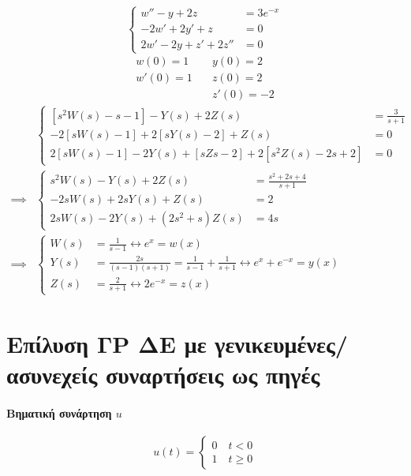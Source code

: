 \documentclass[11pt,a4paper,titlepage,final]{article}
\begin{document}
\begin{exercise*}{12.17}
	\[
	\begin{cases}
	w''-y+2z &= 3e^{-x} \\
	-2w'+2y'+z &= 0 \\
	2w'-2y+z'+2z'' &= 0
	\end{cases}
	\]
	\begin{align*}
	w(0)=1 \quad & y(0) = 2 \\
	w'(0)=1 \quad & z(0) = 2 \\
	& z'(0) = -2
	\end{align*}
	\tcblower
	\begin{align*}
	& \begin{cases}
	\left[s^2W(s)-s-1\right]-Y(s)+2Z(s) &= \frac{3}{s+1} \\
	-2\left[sW(s)-1\right]+2\left[sY(s)-2\right]+Z(s) &= 0 \\
	2\left[sW(s)-1\right]-2Y(s) + \left[sZs-2\right]+2\left[s^2Z(s)-2s+2\right] &= 0
	\end{cases} \\ \implies &
	\begin{cases}
	s^2W(s) - Y(s)+2Z(s) &= \frac{s^2+2s+4}{s+1} \\
	-2sW(s)+2sY(s)+Z(s) &= 2 \\
	2sW(s)-2Y(s)+(2s^2+s)Z(s) &= 4s
	\end{cases} \\ \implies &
	\begin{cases}
	W(s) &= \frac{1}{s-1} \leftrightarrow e^x =w(x) \\
	Y(s) &= \frac{2s}{(s-1)(s+1)} = \frac{1}{s-1}+\frac{1}{s+1} \leftrightarrow e^x+e^{-x}=y(x) \\
	Z(s) &= \frac{2}{s+1} \leftrightarrow 2e^{-x}=z(x)
	\end{cases}
	\end{align*}
\end{exercise*}

\section{Επίλυση ΓΡ ΔΕ με γενικευμένες/ασυνεχείς συναρτήσεις ως πηγές}
\paragraph{Βηματική συνάρτηση \( u \)}
\[
u(t)= \begin{cases}
0 \quad t<0 \\
1 \quad t \geq0
\end{cases}
\]
\end{document}
